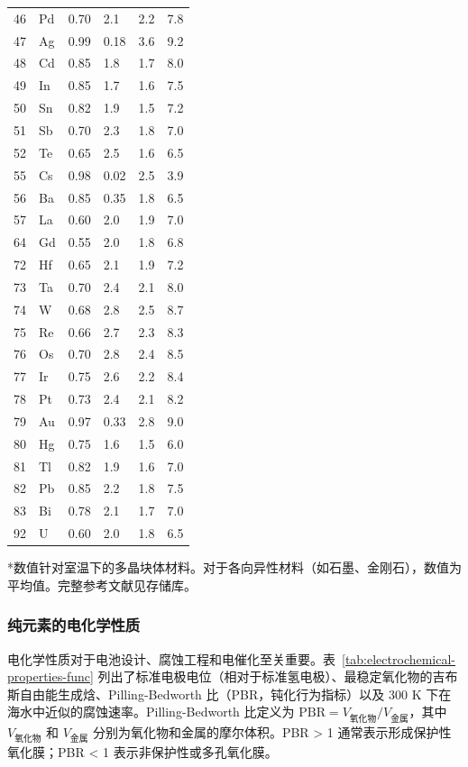 \documentclass[12pt,a4paper]{article}
\begin{document}
\begin{longtable}{p{0.8cm}p{1.2cm}p{2.2cm}p{2.2cm}p{2.2cm}p{2.2cm}}
		46 & Pd & 0.70 & 2.1 & 2.2 & 7.8 \\
		47 & Ag & 0.99 & 0.18 & 3.6 & 9.2 \\
		48 & Cd & 0.85 & 1.8 & 1.7 & 8.0 \\
		49 & In & 0.85 & 1.7 & 1.6 & 7.5 \\
		50 & Sn & 0.82 & 1.9 & 1.5 & 7.2 \\
		51 & Sb & 0.70 & 2.3 & 1.8 & 7.0 \\
		52 & Te & 0.65 & 2.5 & 1.6 & 6.5 \\
		55 & Cs & 0.98 & 0.02 & 2.5 & 3.9 \\
		56 & Ba & 0.85 & 0.35 & 1.8 & 6.5 \\
		57 & La & 0.60 & 2.0 & 1.9 & 7.0 \\
		64 & Gd & 0.55 & 2.0 & 1.8 & 6.8 \\
		72 & Hf & 0.65 & 2.1 & 1.9 & 7.2 \\
		73 & Ta & 0.70 & 2.4 & 2.1 & 8.0 \\
		74 & W  & 0.68 & 2.8 & 2.5 & 8.7 \\
		75 & Re & 0.66 & 2.7 & 2.3 & 8.3 \\
		76 & Os & 0.70 & 2.8 & 2.4 & 8.5 \\
		77 & Ir & 0.75 & 2.6 & 2.2 & 8.4 \\
		78 & Pt & 0.73 & 2.4 & 2.1 & 8.2 \\
		79 & Au & 0.97 & 0.33 & 2.8 & 9.0 \\
		80 & Hg & 0.75 & 1.6 & 1.5 & 6.0 \\
		81 & Tl & 0.82 & 1.9 & 1.6 & 7.0 \\
		82 & Pb & 0.85 & 2.2 & 1.8 & 7.5 \\
		83 & Bi & 0.78 & 2.1 & 1.7 & 7.0 \\
		92 & U  & 0.60 & 2.0 & 1.8 & 6.5 \\
		\bottomrule
	\end{longtable}
	*数值针对室温下的多晶块体材料。对于各向异性材料（如石墨、金刚石），数值为平均值。完整参考文献见存储库。
	
	\subsubsection{纯元素的电化学性质}
	\label{subsec:electrochemical-properties-func}
	
	电化学性质对于电池设计、腐蚀工程和电催化至关重要。表~\ref{tab:electrochemical-properties-func} 列出了标准电极电位（相对于标准氢电极）、最稳定氧化物的吉布斯自由能生成焓、Pilling-Bedworth 比（PBR，钝化行为指标）以及 300 K 下在海水中近似的腐蚀速率。Pilling-Bedworth 比定义为 \(\text{PBR} = V_{\text{氧化物}} / V_{\text{金属}}\)，其中 \(V_{\text{氧化物}}\) 和 \(V_{\text{金属}}\) 分别为氧化物和金属的摩尔体积。PBR > 1 通常表示形成保护性氧化膜；PBR < 1 表示非保护性或多孔氧化膜。
	
\end{document}
